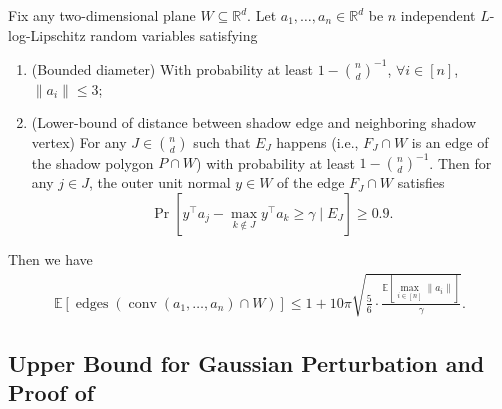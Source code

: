 \documentclass{theoretics}
\newcommand{\R}{\mathbb R}
\newcommand{\E}{\mathbb E}
\newcommand{\conv}{\operatorname{conv}}
\newcommand{\edges}{\operatorname{edges}}
\renewcommand{\subset}{\subseteq}
\begin{document}
\begin{lemma}\label{lem:ub-lipschitz}
    Fix any two-dimensional plane $W \subset \R^d$.
    Let $a_1, \ldots, a_n \in \R^d$ be $n$ independent $L$-log-Lipschitz random variables satisfying
    \begin{enumerate}
        \item (Bounded diameter) With probability at least $1 - \binom{n}{d}^{-1}$, $\forall i \in [n]$, $\|a_i\| \leq 3$;
        \item (Lower-bound of distance between shadow edge and neighboring shadow vertex) 
        For any $J \in \binom{n}{d}$ such that $E_J$ happens (i.e., $F_J \cap W$ is an edge of the shadow polygon $P \cap W$) with probability at least $1 - \binom{n}{d}^{-1}$.
        Then for any $j\in J$, the outer unit normal $y \in W$ of the edge $F_J \cap W$ satisfies 
        $$\Pr[y^\top a_j - \max_{k \notin J} y^\top a_k \geq \gamma \mid E_J] \geq 0.9 .$$
    \end{enumerate}
    Then we have 
    \begin{align*}
        \E\left[ \edges\left(\conv(a_1, \ldots, a_n) \cap W \right) \right] \leq 1 + 10\pi \sqrt{\frac{5}{6} \cdot \frac{\E[\max_{i \in [n]}\|a_i\|]}{\gamma}}.
    \end{align*}
\end{lemma}

\subsection{Upper Bound for Gaussian Perturbation and Proof of }\label{sec:from-gaussian-to-lip}
\end{document}
